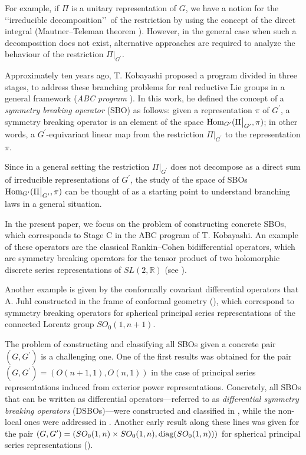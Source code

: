 \documentclass[12pt, pdflatex, a4paper]{article}
\theoremstyle{plain}
\theoremstyle{definition}
\def\diag{\text{\normalfont{diag}}}
\def\Hom{\text{\normalfont{Hom}}}
\def\R{{\mathbb R}}
\begin{document}
For example, if $\Pi$ is a unitary representation of $G$, we have a notion for the \lq\lq irreducible decomposition\rq\rq\ of the restriction by using the concept of the direct integral (Mautner--Teleman theorem \cite{Mau50, Tel76}). However, in the general case when such a decomposition does not exist, alternative approaches are required to analyze the behaviour of the restriction $\Pi\big\rvert_{G^\prime}$.


Approximately ten years ago, T. Kobayashi proposed a program divided in three stages, to address these branching problems for real reductive Lie groups in a general framework (\emph{ABC program} \cite{Kob15}). In this work, he defined the concept of a \emph{symmetry breaking operator} (SBO) as follows: given a representation $\pi$ of $G^\prime$, a symmetry breaking operator is an element of the space $\Hom_{G^\prime}(\Pi\big\rvert_{G^\prime}, \pi)$; in other words, a $G^\prime$-equivariant linear map from the restriction $\Pi\big\rvert_{G^\prime}$ to the representation $\pi$.

Since in a general setting the restriction $\Pi\big\rvert_{G^\prime}$ does not decompose as a direct sum of irreducible representations of $G^\prime$, the study of the space of SBOs $\Hom_{G^\prime}(\Pi\big\rvert_{G^\prime}, \pi)$ can be thought of as a starting point to understand branching laws in a general situation. 

In the present paper, we focus on the problem of constructing concrete SBOs, which corresponds to Stage C in the ABC program of T. Kobayashi. An example of these operators are the classical Rankin--Cohen bidifferential operators, which are symmetry breaking operators for the tensor product of two holomorphic discrete series representations of $SL(2,\R)$ (see \cite{Coh75, KP16b, Ran56}).

Another example is given by the conformally covariant differential operators that A. Juhl constructed in the frame of conformal geometry (\cite{Juh09}), which correspond to symmetry breaking operators for spherical principal series representations of the connected Lorentz group $SO_0(1, n+1)$.\medskip

The problem of constructing and classifying all SBOs given a concrete pair $(G, G^\prime)$ is a challenging one. One of the first results was obtained for the pair $(G, G^\prime) = (O(n+1,1), O(n,1))$ in the case of principal series representations induced from exterior power representations. Concretely, all SBOs that can be written as differential operators—referred to as \emph{differential symmetry breaking operators} (DSBOs)—were constructed and classified in \cite{KKP16}, while the non-local ones were addressed in \cite{KS15, KS18}. Another early result along these lines was given for the pair $(G, G^\prime) = (SO_0(1, n) \times SO_0(1,n), \diag(SO_0(1,n)))$ for spherical principal series representations (\cite{Cle16, Cle17}).
\end{document}
